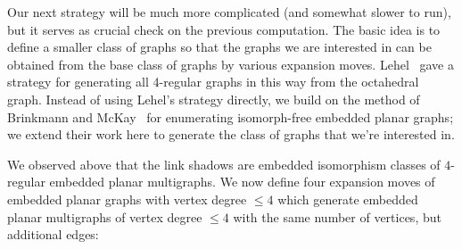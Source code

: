 \documentclass[amsmath,secnumarabic,floatfix,amssymb,nofootinbib,nobibnotes,letterpaper,11pt,tightenlines,showkeys]{revtex4}
\theoremstyle{definition}
\begin{document}
Our next strategy will be much more complicated (and somewhat slower to run), but it serves as crucial check on the previous computation. The basic idea is to define a smaller class of graphs so that the graphs we are interested in can be obtained from the base class of graphs by various expansion moves. Lehel~\cite{JGT:JGT3190050412} gave a strategy for generating all 4-regular graphs in this way from the octahedral graph. Instead of using Lehel's strategy directly, we build on the method of Brinkmann and McKay~\cite{Brinkmann:2007up,McKay:1998wa} for enumerating isomorph-free embedded planar graphs; we extend their work here to generate the class of graphs that we're interested in.

We observed above that the link shadows are embedded isomorphism classes of $4$-regular embedded planar multigraphs. We now define four expansion moves of embedded planar graphs with vertex degree $\leq 4$ which generate embedded planar multigraphs of vertex degree $\leq 4$ with the same number of vertices, but additional edges:
\end{document}
